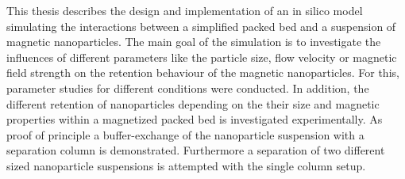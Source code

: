 This thesis describes the design and implementation of an in silico model simulating the interactions between a simplified packed bed and a suspension of magnetic nanoparticles. The main goal of the simulation is to investigate the influences of different parameters like the particle size, flow velocity or magnetic field strength on the retention behaviour of the magnetic nanoparticles. For this, parameter studies for different conditions were conducted. In addition, the different retention of nanoparticles depending on the their size and magnetic properties within a magnetized packed bed is investigated experimentally. As proof of principle a buffer-exchange of the nanoparticle suspension with a separation column is demonstrated. Furthermore a separation of two different sized nanoparticle suspensions is attempted with the single column setup.
